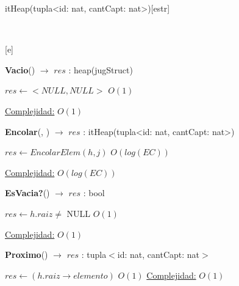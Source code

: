 \begin{Representacion}
 
  \begin{Estructura}{itHeap(tupla<id: nat, cantCapt: nat>)}[estr]
      \begin{Tupla}[estr]%
    \end{Tupla}
  \end{Estructura}


  ~

  [e]{}

\end{Representacion}



\begin{Algoritmos}
   
\begin{algorithm}[H]{\textbf{Vacio}() $\to$ $res$ : heap(jugStruct)}
    	\begin{algorithmic}[1]
			 \State $res \gets  <NULL, NULL> $ \Comment $O(1)$

			\medskip
			\Statex \underline{Complejidad:} $O(1)$
    	\end{algorithmic}
\end{algorithm}
   
\begin{algorithm}[H]{\textbf{Encolar}(, ) $\to$ $res$ : itHeap(tupla<id: nat, cantCapt: nat>)}
    	\begin{algorithmic}[1]
			 \State $res \gets EncolarElem(h, j) $ \Comment $O(log(EC))$
			 

			\medskip
			\Statex \underline{Complejidad:} $O(log(EC))$
    	\end{algorithmic}
\end{algorithm}


\begin{algorithm}[H]{\textbf{EsVacia?}() $\to$ $res$ : bool}
    	\begin{algorithmic}[1]
			 \State $res \gets  h.raiz \not=$ NULL \Comment $O(1)$

			\medskip
			\Statex \underline{Complejidad:} $O(1)$
    	\end{algorithmic}
\end{algorithm}

\begin{algorithm}[H]{\textbf{Proximo}() $\to$ $res$ : tupla$<$id: nat, cantCapt: nat$>$}
    	\begin{algorithmic}[1]
    		 \State $res \gets (h.raiz \rightarrow elemento)$ \Comment $O(1)$
    		 \medskip
			\Statex \underline{Complejidad:} $O(1)$
    	\end{algorithmic}
\end{algorithm}


\end{Algoritmos}
